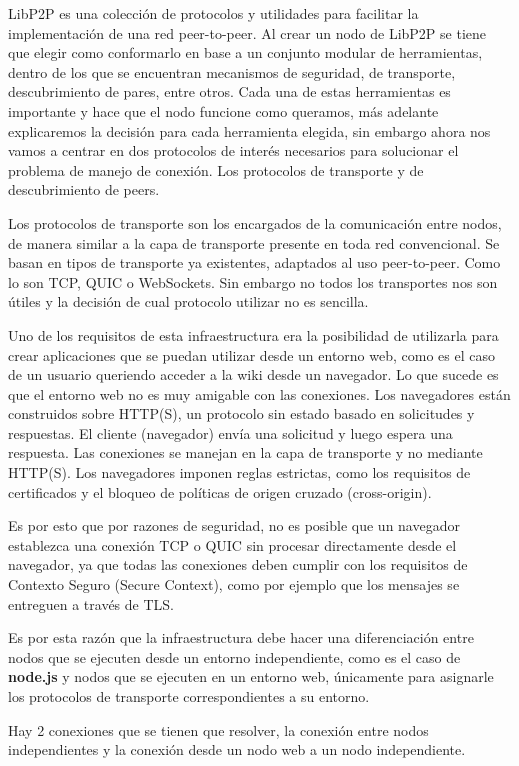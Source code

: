 LibP2P es una colección de protocolos y utilidades para facilitar la implementación de una red peer-to-peer. Al crear un nodo de LibP2P se tiene que elegir como conformarlo en base a un conjunto modular de herramientas, dentro de los que se encuentran mecanismos de seguridad, de transporte, descubrimiento de pares, entre otros. Cada una de estas herramientas es importante y hace que el nodo funcione como queramos, más adelante explicaremos la decisión para cada herramienta elegida, sin embargo ahora nos vamos a centrar en dos protocolos de interés necesarios para solucionar el problema de manejo de conexión. Los protocolos de transporte y de descubrimiento de peers.

Los protocolos de transporte son los encargados de la comunicación entre nodos, de manera similar a la capa de transporte presente en toda red convencional. Se basan en tipos de transporte ya existentes, adaptados al uso peer-to-peer. Como lo son TCP, QUIC o WebSockets. Sin embargo no todos los transportes nos son útiles y la decisión de cual protocolo utilizar no es sencilla.

Uno de los requisitos de esta infraestructura era la posibilidad de utilizarla para crear aplicaciones que se puedan utilizar desde un entorno web, como es el caso de un usuario queriendo acceder a la wiki desde un navegador. Lo que sucede es que el entorno web no es muy amigable con las conexiones. Los navegadores están construidos sobre HTTP(S), un protocolo sin estado basado en solicitudes y respuestas. El cliente (navegador) envía una solicitud y luego espera una respuesta. Las conexiones se manejan en la capa de transporte y no mediante HTTP(S). Los navegadores imponen reglas estrictas, como los requisitos de certificados y el bloqueo de políticas de origen cruzado (cross-origin).

Es por esto que por razones de seguridad, no es posible que un navegador establezca una conexión TCP o QUIC sin procesar directamente desde el navegador, ya que todas las conexiones deben cumplir con los requisitos de Contexto Seguro (Secure Context), como por ejemplo que los mensajes se entreguen a través de TLS.

Es por esta razón que la infraestructura debe hacer una diferenciación entre nodos que se ejecuten desde un entorno independiente, como es el caso de \textbf{node.js}\cite{nodejs} y nodos que se ejecuten en un entorno web, únicamente para asignarle los protocolos de transporte correspondientes a su entorno.

Hay 2 conexiones que se tienen que resolver, la conexión entre nodos independientes y la conexión desde un nodo web a un nodo independiente.

